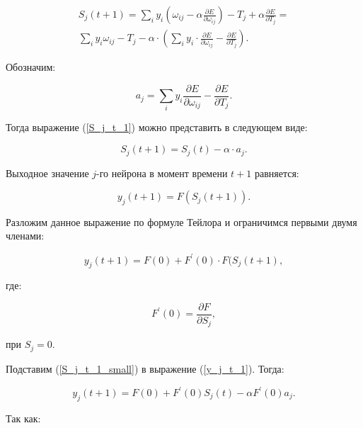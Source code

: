 \begin{equation}\label{S_j_t_1}
    \begin{split}
        S_j(t + 1) = \sum_{i}{y_i(\omega_{i j} - \alpha\frac{\partial E}{\partial\omega_{ij}}) - T_j + \alpha\frac{\partial E}{\partial T_j}} = \\
        \sum_{i}{y_i\omega_{i j} - T_j - \alpha\cdot(\sum_{i}{y_i\cdot\frac{\partial E}{\partial\omega_{i j}} - \frac{\partial E}{\partial T_j}})}.
    \end{split}
\end{equation}

Обозначим:

\begin{equation}\label{a_j}
    a_j = \sum_{i}{y_i\frac{\partial E}{\partial\omega_{ij}} - \frac{\partial E}{\partial T_j}}.
\end{equation}

Тогда выражение (\ref{S_j_t_1}) можно представить в следующем виде:

\begin{equation}\label{S_j_t_1_small}
    S_j(t + 1) = S_j(t) - \alpha\cdot a_j.
\end{equation}

Выходное значение $j$-го нейрона в момент времени $t + 1$ равняется:

\begin{equation}
    y_j(t + 1) = F(S_j(t + 1)).
\end{equation}

Разложим данное выражение по формуле Тейлора и ограничимся первыми двумя членами:

\begin{equation}\label{y_j_t_1}
    y_j(t + 1) = F(0) + F^\prime(0)\cdot F(S_j(t + 1),
\end{equation}

где:

\begin{equation}
    F^\prime(0) = \frac{\partial F}{\partial S_j},
\end{equation}

при $S_j = 0$.

Подставим (\ref{S_j_t_1_small}) в выражение (\ref{y_j_t_1}). Тогда:

\begin{equation}\label{y_j_t_1_mod}
    y_j(t + 1) = F(0)+F^\prime(0)S_j(t) - \alpha F^\prime(0) a_j.
\end{equation}

Так как:

